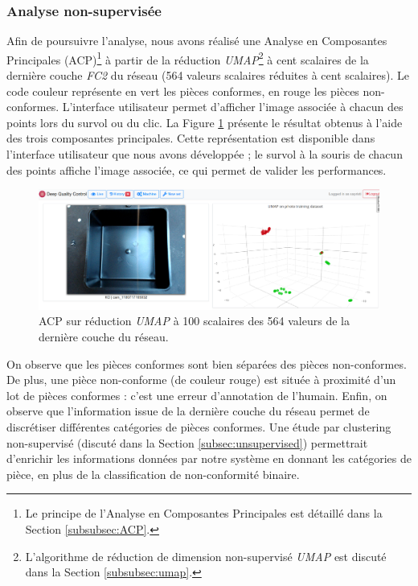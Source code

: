 \subsubsection{Analyse non-supervisée}
Afin de poursuivre l'analyse, nous avons réalisé une Analyse en Composantes Principales (ACP)\footnote{Le principe de l'Analyse en Composantes Principales est détaillé dans la Section \ref{subsubsec:ACP}.} à partir de la réduction \textit{UMAP}\footnote{L'algorithme de réduction de dimension non-supervisé \textit{UMAP} est discuté dans la Section \ref{subsubsec:umap}.} à cent scalaires de la dernière couche \textit{FC2} du réseau (564 valeurs scalaires réduites à cent scalaires).
Le code couleur représente en vert les pièces conformes, en rouge les pièces non-conformes. L'interface utilisateur permet d'afficher l'image associée à chacun des points lors du survol ou du clic.
La Figure \ref{fig:umap_box} présente le résultat obtenus à l'aide des trois composantes principales.
Cette représentation est disponible dans l'interface utilisateur que nous avons développée ; le survol à la souris de chacun des points affiche l'image associée, ce qui permet de valider les performances.

\begin{figure}[tbhp]
	\centering
	\includegraphics[width=\textwidth,height=\textheight,keepaspectratio]{../Chap5/Figures/Capture-2018-11-21-15-12-07.png}
	\caption{ACP sur réduction \textit{UMAP} à 100 scalaires des 564 valeurs de la dernière couche du réseau.}
	\label{fig:umap_box}
\end{figure}

On observe que les pièces conformes sont bien séparées des pièces non-conformes.
De plus, une pièce non-conforme (de couleur rouge) est située à proximité d'un lot de pièces conformes : c'est une erreur d'annotation de l'humain.
Enfin, on observe que l'information issue de la dernière couche du réseau permet de discrétiser différentes catégories de pièces conformes.
Une étude par clustering non-supervisé (discuté dans la Section \ref{subsec:unsupervised}) permettrait d'enrichir les informations données par notre système en donnant les catégories de pièce, en plus de la classification de non-conformité binaire.

